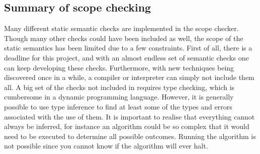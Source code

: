 \subsection{Summary of scope checking}
Many different static semantic checks are implemented in the scope checker.
Though many other checks could have been included as well, the scope of the
static semantics has been limited due to a few constraints. First of all, there
is a deadline for this project, and with an almost endless set of semantic
checks one can keep developing these checks. Furthermore, with new techniques
being discovered once in a while, a compiler or interpreter can simply not
include them all. A big set of the checks not included in \productname{}
requires type checking, which is cumbersome in a dynamic programming language.
However, it is generally possible to use type inference to find at least some of
the types and errors associated with the use of them. It is important to realise
that everything cannot always be inferred, for instance an algorithm could be so
complex that it would need to be executed to determine all possible outcomes.
Running the algorithm is not possible since you cannot know if the algorithm
will ever halt\cite[p. 173]{itttoc}.
